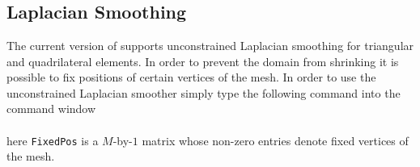  \\
 \\
 \\

\subsection{Laplacian Smoothing}

The current version of \LIBNAME supports unconstrained Laplacian smoothing for triangular and quadrilateral elements. In order
to prevent the domain from shrinking it is possible to fix positions of certain vertices of the mesh. In order to use the
unconstrained Laplacian smoother simply type the following command into the \MATLAB command window \\

 \\

\noindent here {\tt FixedPos} is a $M$-by-$1$ matrix whose non-zero entries denote fixed vertices of the mesh.
